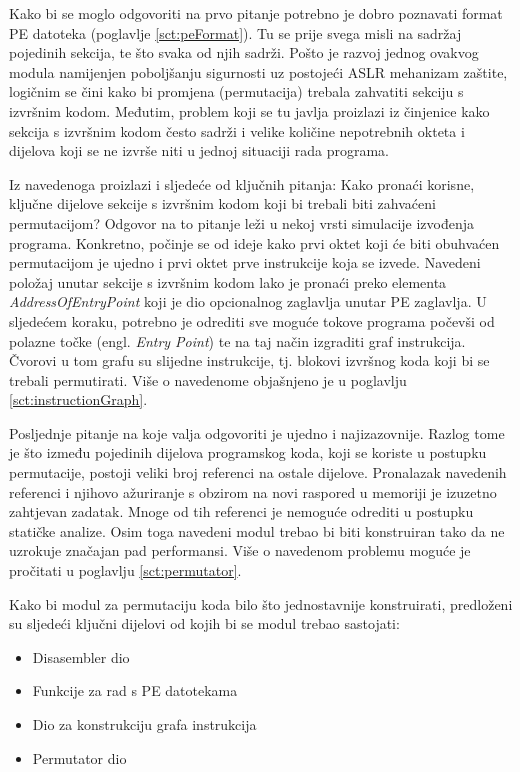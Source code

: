 \documentclass[times, utf8, diplomski, numeric]{fer}
\begin{document}
Kako bi se moglo odgovoriti na prvo pitanje potrebno je dobro
poznavati format PE datoteka (poglavlje \ref{sct:peFormat}). Tu se		%
prije svega misli na sadržaj pojedinih sekcija, te što svaka od
njih sadrži. Pošto je razvoj jednog ovakvog modula namijenjen
poboljšanju sigurnosti uz postojeći ASLR mehanizam zaštite,
logičnim se čini kako bi promjena (permutacija) trebala zahvatiti
sekciju s izvršnim kodom. Međutim, problem koji se tu javlja
proizlazi iz činjenice kako sekcija s izvršnim kodom često
sadrži i velike količine nepotrebnih okteta i dijelova koji se ne
izvrše niti u jednoj situaciji rada programa. 

Iz navedenoga proizlazi i sljedeće od ključnih pitanja: Kako
pronaći korisne, ključne dijelove sekcije s izvršnim kodom koji
bi trebali biti zahvaćeni permutacijom? Odgovor na to pitanje
leži u nekoj vrsti simulacije izvođenja programa. Konkretno,
počinje se od ideje kako prvi oktet koji će biti obuhvaćen
permutacijom je ujedno i prvi oktet prve instrukcije koja se
izvede. Navedeni položaj unutar sekcije s izvršnim kodom lako je
pronaći preko elementa \emph{AddressOfEntryPoint} koji je dio
opcionalnog zaglavlja unutar PE zaglavlja. U sljedećem koraku,
potrebno je odrediti sve moguće tokove programa počevši od
polazne točke (engl. \emph{Entry Point}) te na taj način
izgraditi graf instrukcija. Čvorovi u tom grafu su slijedne
instrukcije, tj. blokovi izvršnog koda koji bi se trebali
permutirati. Više o navedenome objašnjeno je u poglavlju 
\ref{sct:instructionGraph}.							%

Posljednje pitanje na koje valja odgovoriti je ujedno i
najizazovnije. Razlog tome je što između pojedinih dijelova
programskog koda, koji se koriste u postupku permutacije, postoji
veliki broj referenci na ostale dijelove. Pronalazak navedenih
referenci i njihovo ažuriranje s obzirom na novi raspored u
memoriji je izuzetno zahtjevan zadatak. Mnoge od tih referenci je
nemoguće odrediti u postupku statičke analize. Osim toga navedeni
modul trebao bi biti konstruiran tako da ne uzrokuje značajan
pad performansi. Više o navedenom problemu moguće je pročitati u
poglavlju \ref{sct:permutator}.

Kako bi modul za permutaciju koda bilo što jednostavnije
konstruirati, predloženi su sljedeći ključni dijelovi od kojih bi
se modul trebao sastojati:

\begin{itemize}
\item Disasembler dio
\item Funkcije za rad s PE datotekama
\item Dio za konstrukciju grafa instrukcija
\item Permutator dio
\end{itemize}
\end{document}
